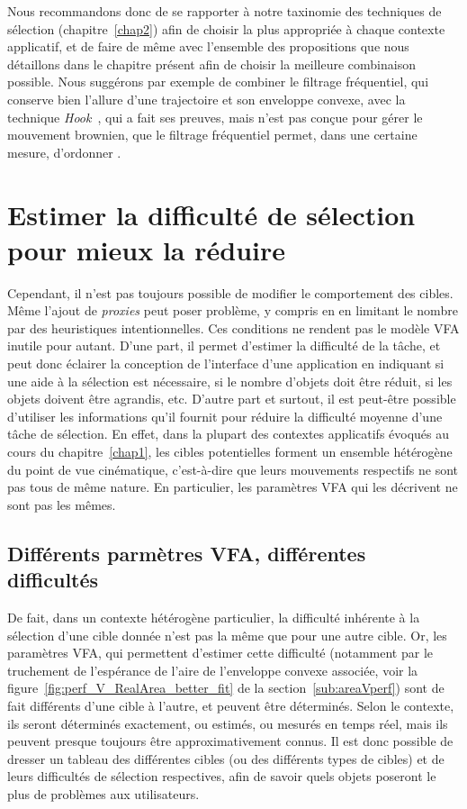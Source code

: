 	Nous recommandons donc de se rapporter à notre taxinomie des techniques de sélection (chapitre~\ref{chap2}) afin de choisir la plus appropriée à chaque contexte applicatif, et de faire de même avec l'ensemble des propositions que nous détaillons dans le chapitre présent afin de choisir la meilleure combinaison possible. Nous suggérons par exemple de combiner le filtrage fréquentiel, qui conserve bien l'allure d'une trajectoire et son enveloppe convexe, avec la technique \emph{Hook}~\cite{ortega2013hook}, qui a fait ses preuves, mais n'est pas conçue pour gérer le mouvement brownien, que le filtrage fréquentiel permet, dans une certaine mesure, \og d'ordonner \fg{}.

\section{Estimer la difficulté de sélection pour mieux la réduire}
	Cependant, il n'est pas toujours possible de modifier le comportement des cibles. Même l'ajout de \emph{proxies} peut poser problème, y compris en en limitant le nombre par des heuristiques intentionnelles. Ces conditions ne rendent pas le modèle VFA inutile pour autant. D'une part, il permet d'estimer la difficulté de la tâche, et peut donc éclairer la conception de l'interface d'une application en indiquant si une aide à la sélection est nécessaire, si le nombre d'objets doit être réduit, si les objets doivent être agrandis, etc. D'autre part et surtout, il est peut-être possible d'utiliser les informations qu'il fournit pour réduire la difficulté moyenne d'une tâche de sélection. En effet, dans la plupart des contextes applicatifs évoqués au cours du chapitre~\ref{chap1}, les cibles potentielles forment un ensemble hétérogène du point de vue cinématique, c'est-à-dire que leurs mouvements respectifs ne sont pas tous de même nature. En particulier, les paramètres VFA qui les décrivent ne sont pas les mêmes.
	
	\subsection{Différents parmètres VFA, différentes difficultés}
	De fait, dans un contexte hétérogène particulier, la difficulté inhérente à la sélection d'une cible donnée n'est pas la même que pour une autre cible. Or, les paramètres VFA, qui permettent d'estimer cette difficulté (notamment par le truchement de l'espérance de l'aire de l'enveloppe convexe associée, voir la figure~\ref{fig:perf_V_RealArea_better_fit} de la section~\ref{sub:areaVperf}) sont de fait différents d'une cible à l'autre, et peuvent être déterminés. Selon le contexte, ils seront déterminés exactement, ou estimés, ou mesurés en temps réel, mais ils peuvent presque toujours être approximativement connus. Il est donc possible de dresser un tableau des différentes cibles (ou des différents types de cibles) et de leurs difficultés de sélection respectives, afin de savoir quels objets poseront le plus de problèmes aux utilisateurs.
	
